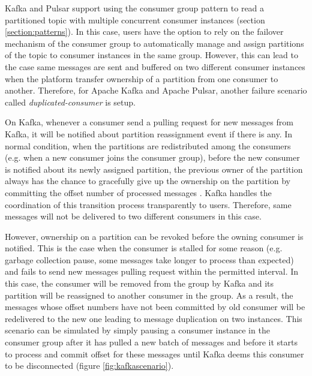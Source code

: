 Kafka and Pulsar support using the consumer group pattern to read a partitioned topic with multiple concurrent consumer instances (section \ref{section:patterns}). In this case, users have the option to rely on the failover mechanism of the consumer group to automatically manage and assign partitions of the topic to consumer instances in the same group. However, this can lead to the case same messages are sent and buffered on two different consumer instances when the platform transfer ownership of a partition from one consumer to another. Therefore, for Apache Kafka and Apache Pulsar, another failure scenario called \emph{duplicated-consumer} is setup.

On Kafka, whenever a consumer send a pulling request for new messages from Kafka, it will be notified about partition reassignment event if there is any. In normal condition, when the partitions are redistributed among the consumers (e.g. when a new consumer joins the consumer group), before the new consumer is notified about its newly assigned partition, the previous owner of the partition always has the chance to gracefully give up the ownership on the partition by committing the offset number of processed messages \cite{kafkaconsumerimplement}. Kafka handles the coordination of this transition process transparently to users. Therefore, same messages will not be delivered to two different consumers in this case. 

However, ownership on a partition can be revoked before the owning consumer is notified. This is the case when the consumer is stalled for some reason (e.g. garbage collection pause, some messages take longer to process than expected) and fails to send new messages pulling request within the permitted interval. In this case, the consumer will be removed from the group by Kafka and its partition will be reassigned to another consumer in the group. As a result, the messages whose offset numbers have not been committed by old consumer will be redelivered to the new one leading to message duplication on two instances. This scenario can be simulated by simply pausing a consumer instance in the consumer group after it has pulled a new batch of messages and before it starts to process and commit offset for these messages until Kafka deems this consumer to be disconnected (figure \ref{fig:kafkascenario}). 

